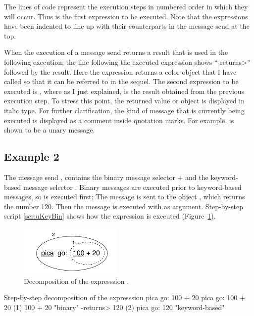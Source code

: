 \documentclass[a4paper,10pt,twoside]{book}
\begin{document}
The lines of code represent the execution steps in numbered order in which they will occur. 
Thus  is the first expression to be executed. Note that the expressions have been 
indented to line up with their counterparts in the message send at the top. 

When the execution of a message send returns a result that is used in the following execution, the line following the executed expression shows “-returns>” followed by the result. Here 
the expression  returns a color object that I have called  so that it can be 
referred to in the sequel. The second expression to be executed is , where 
as I just explained,  is the result obtained from the previous execution step. To stress 
this point, the returned value or object is displayed in italic type. For further clarification, the 
kind of message that is currently being executed is displayed as a comment inside quotation 
marks. For example,  is shown to be a unary message. 


\subsection{Example 2}
The message send , contains the binary message selector + and the keyword-based message selector . Binary messages are executed prior to keyword-based 
messages, so  is executed first: The message  is sent to the object , which 
returns the number 120. Then the message  is executed with  as argument. 
Step-by-step script \ref{scr:uKeyBin} shows how the expression is executed (Figure~\ref{fig:uKeyBin}). 

\begin{figure}[h]
	\centerline{\includegraphics[width=5cm]{uKeyBin}}
	\caption{Decomposition of the expresssion . 
	\label{fig:uKeyBin}}
\end{figure}

\begin{script}[uKeyBin]{Step-by-step decomposition of the expresssion pica go: 100 + 20}
pica go: 100 + 20 
(1)          100 + 20      "binary" 
-returns> 120 
(2) pica go: 120           "keyword-based" 
\end{script}
\end{document}
